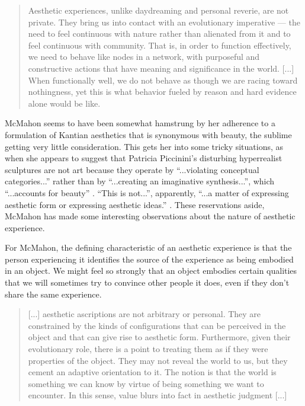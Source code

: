             \begin{quote}
                Aesthetic experiences, unlike daydreaming and personal reverie, are not private. They bring us into contact with an evolutionary imperative — the need to feel continuous with nature rather than alienated from it and to feel continuous with community. That is, in order to function effectively, we need to behave like nodes in a network, with purposeful and constructive actions that have meaning and significance in the world. [...] When functionally well, we do not behave as though we are racing toward nothingness, yet this is what behavior fueled by reason and hard evidence alone would be like. \citep[p.67]{McMahonCrtclAsthtcRlsm2011}
            \end{quote}

            McMahon seems to have been somewhat hamstrung by her adherence to a formulation of Kantian aesthetics that is synonymous with beauty, the sublime getting very little consideration. This gets her into some tricky situations, as when she appears to suggest that Patricia Piccinini's disturbing hyperrealist sculptures are not art because they operate by “...violating conceptual categories...” rather than by “...creating an imaginative synthesis...”, which “...accounts for beauty” \citep[p.169]{McMahonAsthtcsAndMtrlBty2007}. “This is not...”, apparently, “...a matter of expressing aesthetic form or expressing aesthetic ideas.” \citep[p.26]{McMahonAsthtcsAndMtrlBty2007}. These reservations aside, McMahon has made some interesting observations about the nature of aesthetic experience.
            
            For McMahon, the defining characteristic of an aesthetic experience is that the person experiencing it identifies the source of the experience as being embodied in an object. We might feel so strongly that an object embodies certain qualities that we will sometimes try to convince other people it does, even if they don't share the same experience.

            \begin{quote}
                [...] aesthetic ascriptions are not arbitrary or personal. They are constrained by the kinds of configurations that can be perceived in the object and that can give rise to aesthetic form. Furthermore, given their evolutionary role, there is a point to treating them as if they were properties of the object. They may not reveal the world to us, but they cement an adaptive orientation to it. The notion is that the world is something we can know by virtue of being something we want to encounter. In this sense, value blurs into fact in aesthetic judgment [...] \citep[p.67]{McMahonCrtclAsthtcRlsm2011}
            \end{quote}
            
